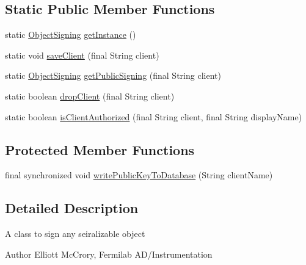 \subsection*{Static Public Member Functions}
\begin{DoxyCompactItemize}
\item 
static \hyperlink{classgov_1_1fnal_1_1ppd_1_1dd_1_1util_1_1ObjectSigning}{Object\-Signing} \hyperlink{classgov_1_1fnal_1_1ppd_1_1dd_1_1util_1_1ObjectSigning_a26bfbdba5d8c5f16fdcba60f08b19218}{get\-Instance} ()
\item 
static void \hyperlink{classgov_1_1fnal_1_1ppd_1_1dd_1_1util_1_1ObjectSigning_ad897d0a143f3d05dec25e5ce2a073c62}{save\-Client} (final String client)
\item 
static \hyperlink{classgov_1_1fnal_1_1ppd_1_1dd_1_1util_1_1ObjectSigning}{Object\-Signing} \hyperlink{classgov_1_1fnal_1_1ppd_1_1dd_1_1util_1_1ObjectSigning_a376a60ae008f77db2a3745096fcce056}{get\-Public\-Signing} (final String client)
\item 
static boolean \hyperlink{classgov_1_1fnal_1_1ppd_1_1dd_1_1util_1_1ObjectSigning_a962a6915fbfc713489d4e0c21e01aad5}{drop\-Client} (final String client)
\item 
static boolean \hyperlink{classgov_1_1fnal_1_1ppd_1_1dd_1_1util_1_1ObjectSigning_aa8c327ae8cdd7a6c8bce3926e753a951}{is\-Client\-Authorized} (final String client, final String display\-Name)
\end{DoxyCompactItemize}
\subsection*{Protected Member Functions}
\begin{DoxyCompactItemize}
\item 
final synchronized void \hyperlink{classgov_1_1fnal_1_1ppd_1_1dd_1_1util_1_1ObjectSigning_a6f4e04a43a9f46432df4a6d08d8702d1}{write\-Public\-Key\-To\-Database} (String client\-Name)
\end{DoxyCompactItemize}


\subsection{Detailed Description}
A class to sign any seiralizable object 

\begin{DoxyAuthor}{Author}
Elliott Mc\-Crory, Fermilab A\-D/\-Instrumentation 
\end{DoxyAuthor}


